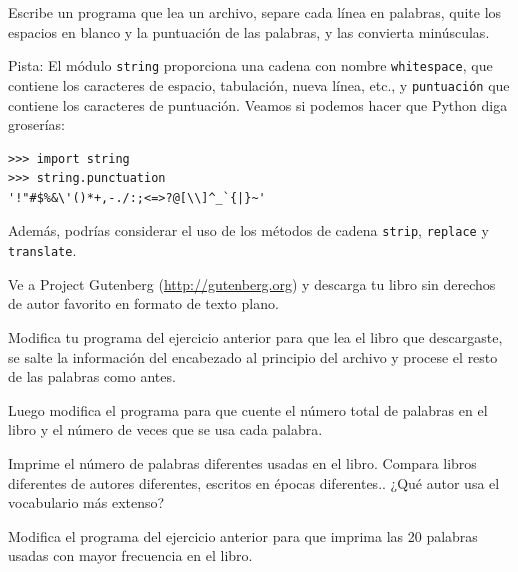 \documentclass[10pt]{book}
\begin{document}
\begin{exercise}

Escribe un programa que lea un archivo, separe cada línea en
palabras, quite los espacios en blanco y la puntuación de las palabras,
y las convierta minúsculas.

Pista: El módulo {\tt string} proporciona una cadena con nombre {\tt whitespace},
que contiene los caracteres de espacio, tabulación, nueva línea, etc.,
y {\tt puntuación} que contiene los caracteres de puntuación.  Veamos
si podemos hacer que Python diga groserías:

\begin{verbatim}
>>> import string
>>> string.punctuation
'!"#$%&\'()*+,-./:;<=>?@[\\]^_`{|}~'
\end{verbatim}
%
Además, podrías considerar el uso de los métodos de cadena {\tt strip},
{\tt replace} y {\tt translate}.

\end{exercise}


\begin{exercise}

Ve a Project Gutenberg (\url{http://gutenberg.org}) y descarga
tu libro sin derechos de autor favorito en formato de texto plano.

Modifica tu programa del ejercicio anterior para que lea el libro
que descargaste, se salte la información del encabezado al principio
del archivo y procese el resto de las palabras como antes.

Luego modifica el programa para que cuente el número total de palabras en
el libro y el número de veces que se usa cada palabra.

Imprime el número de palabras diferentes usadas en el libro.  Compara
libros diferentes de autores diferentes, escritos en épocas diferentes..
¿Qué autor usa el vocabulario más extenso?
\end{exercise}


\begin{exercise}

Modifica el programa del ejercicio anterior para que imprima las
20 palabras usadas con mayor frecuencia en el libro.

\end{exercise}
\end{document}
